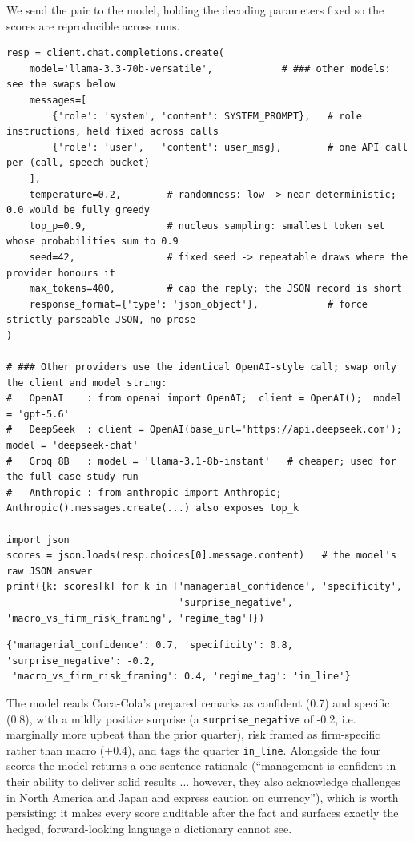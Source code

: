 We send the pair to the model, holding the decoding parameters fixed so the scores are reproducible across runs.

\begin{verbatim}
resp = client.chat.completions.create(
    model='llama-3.3-70b-versatile',            # ### other models: see the swaps below
    messages=[
        {'role': 'system', 'content': SYSTEM_PROMPT},   # role instructions, held fixed across calls
        {'role': 'user',   'content': user_msg},        # one API call per (call, speech-bucket)
    ],
    temperature=0.2,        # randomness: low -> near-deterministic; 0.0 would be fully greedy
    top_p=0.9,              # nucleus sampling: smallest token set whose probabilities sum to 0.9
    seed=42,                # fixed seed -> repeatable draws where the provider honours it
    max_tokens=400,         # cap the reply; the JSON record is short
    response_format={'type': 'json_object'},            # force strictly parseable JSON, no prose
)

# ### Other providers use the identical OpenAI-style call; swap only the client and model string:
#   OpenAI    : from openai import OpenAI;  client = OpenAI();  model = 'gpt-5.6'
#   DeepSeek  : client = OpenAI(base_url='https://api.deepseek.com');  model = 'deepseek-chat'
#   Groq 8B   : model = 'llama-3.1-8b-instant'   # cheaper; used for the full case-study run
#   Anthropic : from anthropic import Anthropic; Anthropic().messages.create(...) also exposes top_k

import json
scores = json.loads(resp.choices[0].message.content)   # the model's raw JSON answer
print({k: scores[k] for k in ['managerial_confidence', 'specificity',
                              'surprise_negative', 'macro_vs_firm_risk_framing', 'regime_tag']})
\end{verbatim}

\begin{verbatim}
{'managerial_confidence': 0.7, 'specificity': 0.8, 'surprise_negative': -0.2,
 'macro_vs_firm_risk_framing': 0.4, 'regime_tag': 'in_line'}
\end{verbatim}

The model reads Coca-Cola's prepared remarks as confident (0.7) and specific (0.8), with a mildly positive surprise (a \texttt{surprise\_negative} of -0.2, i.e. marginally more upbeat than the prior quarter), risk framed as firm-specific rather than macro (+0.4), and tags the quarter \texttt{in\_line}. Alongside the four scores the model returns a one-sentence rationale (``management is confident in their ability to deliver solid results ... however, they also acknowledge challenges in North America and Japan and express caution on currency''), which is worth persisting: it makes every score auditable after the fact and surfaces exactly the hedged, forward-looking language a dictionary cannot see.

